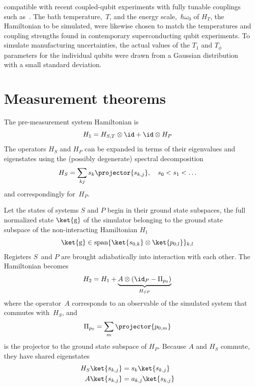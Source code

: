 \documentclass[11pt,oneside,final]{huthesis}%
\begin{document}
compatible with recent coupled-qubit experiments with fully tunable
couplings such as~\cite{Niskanen07}.
The bath temperature,~$T$, and the energy scale,~$\hbar \omega_0$ of
$H_T$, the Hamiltonian to be simulated,
were likewise chosen to match the temperatures and coupling strengths
found in contemporary superconducting qubit experiments.
To simulate manufacturing uncertainties, the actual values of the
$T_1$ and $T_\phi$
parameters for the individual qubits were drawn from a Gaussian
distribution with a small standard deviation.




\section{Measurement theorems}

The pre-measurement system Hamiltonian is 
\begin{equation}
\label{eq:H1}
H_{1} = H_{S,T} \otimes \id + \id \otimes H_P
\end{equation}
The operators $H_S$ and $H_P$ can be expanded in terms of their
eigenvalues and eigenstates using the (possibly degenerate) spectral
decomposition
\begin{equation}
H_{S} = \sum_{kj} s_k \projector{s_{k,j}}, \quad s_0 < s_1 < \ldots
\end{equation}
and correspondingly for~$H_P$.

Let the states of systems $S$ and $P$ begin in their ground state
subspaces, 
the full normalized state $\ket{\text{g}}$ of
the simulator belonging to the ground state subspace
of the non-interacting Hamiltonian $H_1$
\begin{equation}
	\ket{\text{g}} \in \textrm{span} \{ \ket{s_{0,k}}\otimes\ket{p_{0,l}} \}_{k,l}
\end{equation}
Registers $S$~and $P$ are brought adiabatically into interaction with each other.
The Hamiltonian becomes
\begin{equation}
\label{eq:H2}
H_2 = H_1 + \underbrace{A \otimes (\id_P -\Pi_{p_0})}_{H_{SP}}
\end{equation}
where the operator~$A$ corresponds to an observable of the simulated system
that commutes with~$H_S$, and
\begin{equation}
\Pi_{p_0} = \sum_m \projector{p_{0,m}}
\end{equation}
is the projector to
the ground state subspace of $H_P$.
Because $A$ and $H_S$ commute, they have shared eigenstates
\begin{align}
H_S \ket{s_{k,j}} &= s_k \ket{s_{k,j}}\\
A\ket{s_{k,j}} &= a_{k,j} \ket{s_{k,j}}
\end{align}
\end{document}
